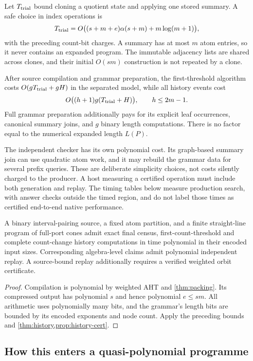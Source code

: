 Let $T_{\rm trial}$ bound cloning a quotient state and applying one stored
summary. A safe choice in index operations is
\[
 T_{\rm trial}=O\bigl((s+m+e)\alpha(s+m)+m\log(m+1)\bigr),
\]
with the preceding count-bit charges. A summary has at most $m$ atom
entries, so it never contains an expanded program. The immutable adjacency
lists are shared across clones, and their initial $O(sm)$ construction is
not repeated by a clone.

After source compilation and grammar preparation, the first-threshold
algorithm costs $O(gT_{\rm trial}+gH)$ in the separated model, while all
history events cost
\[
 O\bigl((h+1)g(T_{\rm trial}+H)\bigr),\qquad h\le2m-1.
\]
Full grammar preparation additionally pays for its explicit leaf occurrences,
canonical summary joins, and $g$ binary length computations. There is no
factor equal to the numerical expanded length $L(P)$.

The independent checker has its own polynomial cost. Its graph-based summary
join can use quadratic atom work, and it may rebuild the grammar data for
several prefix queries. These are deliberate simplicity choices, not costs
silently charged to the producer. A host measuring a certified operation
must include both generation and replay. The timing tables below measure
production search, with answer checks outside the timed region, and do not
label those times as certified end-to-end native performance.

\begin{corollary}
\label{cor:local-poly}
A binary interval-pairing source, a fixed atom partition, and a finite
straight-line program of full-port cones admit exact final census,
first-count-threshold and complete count-change history computations in
time polynomial in their encoded input sizes. Corresponding algebra-level
claims admit polynomial independent replay. A source-bound replay additionally
requires a verified weighted orbit certificate.
\end{corollary}

\begin{proof}
Compilation is polynomial by weighted AHT and \cref{thm:packing}.
Its compressed output has polynomial $s$ and hence polynomial $e\le sm$.
All arithmetic uses polynomially many bits, and the grammar's length bits
are bounded by its encoded exponents and node count. Apply the preceding
bounds and \cref{thm:history,prop:history-cert}.
\end{proof}

\subsection{How this enters a quasi-polynomial programme}

